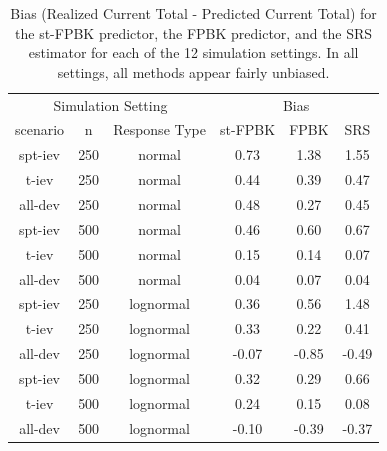 \documentclass[]{interact}
\theoremstyle{plain}%
\theoremstyle{definition}
\theoremstyle{remark}
\begin{document}
\begin{table}[H]

\caption{\label{tab:simbiastab}Bias (Realized Current Total - Predicted Current Total) for the st-FPBK predictor, the FPBK predictor, and the SRS estimator for each of the 12 simulation settings. In all settings, all methods appear fairly unbiased.}
\centering
\begin{tabular}[t]{cccccc}
\toprule
\multicolumn{3}{c}{Simulation Setting} & \multicolumn{3}{c}{Bias} \\
\cmidrule(l{3pt}r{3pt}){1-3} \cmidrule(l{3pt}r{3pt}){4-6}
scenario & n & Response Type & st-FPBK & FPBK & SRS\\
\midrule
spt-iev & 250 & normal & 0.73 & 1.38 & 1.55\\
t-iev & 250 & normal & 0.44 & 0.39 & 0.47\\
all-dev & 250 & normal & 0.48 & 0.27 & 0.45\\
\midrule
spt-iev & 500 & normal & 0.46 & 0.60 & 0.67\\
t-iev & 500 & normal & 0.15 & 0.14 & 0.07\\
all-dev & 500 & normal & 0.04 & 0.07 & 0.04\\
\midrule
spt-iev & 250 & lognormal & 0.36 & 0.56 & 1.48\\
t-iev & 250 & lognormal & 0.33 & 0.22 & 0.41\\
all-dev & 250 & lognormal & -0.07 & -0.85 & -0.49\\
\midrule
spt-iev & 500 & lognormal & 0.32 & 0.29 & 0.66\\
t-iev & 500 & lognormal & 0.24 & 0.15 & 0.08\\
all-dev & 500 & lognormal & -0.10 & -0.39 & -0.37\\
\bottomrule
\end{tabular}
\end{table}
\end{document}
